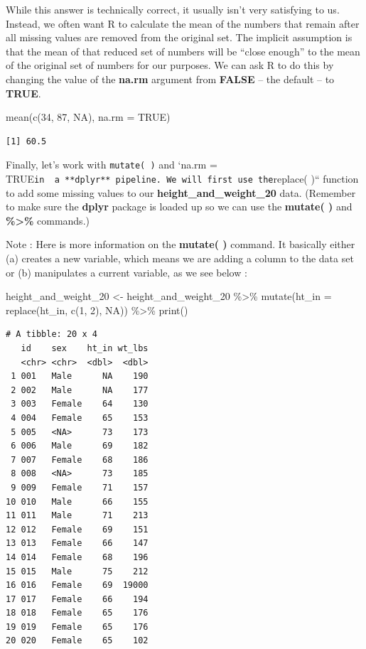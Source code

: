 \documentclass[
  letterpaper,
  DIV=11,
  numbers=noendperiod]{scrreprt}
\newenvironment{Shaded}{\begin{snugshade}}{\end{snugshade}}
\newcommand{\AttributeTok}[1]{\textcolor[rgb]{0.40,0.45,0.13}{#1}}
\newcommand{\ConstantTok}[1]{\textcolor[rgb]{0.56,0.35,0.01}{#1}}
\newcommand{\DecValTok}[1]{\textcolor[rgb]{0.68,0.00,0.00}{#1}}
\newcommand{\FunctionTok}[1]{\textcolor[rgb]{0.28,0.35,0.67}{#1}}
\newcommand{\NormalTok}[1]{\textcolor[rgb]{0.00,0.23,0.31}{#1}}
\newcommand{\OtherTok}[1]{\textcolor[rgb]{0.00,0.23,0.31}{#1}}
\newcommand{\SpecialCharTok}[1]{\textcolor[rgb]{0.37,0.37,0.37}{#1}}
\begin{document}
While this answer is technically correct, it usually isn't very
satisfying to us. Instead, we often want R to calculate the mean of the
numbers that remain after all missing values are removed from the
original set. The implicit assumption is that the mean of that reduced
set of numbers will be ``close enough'' to the mean of the original set
of numbers for our purposes. We can ask R to do this by changing the
value of the \textbf{na.rm} argument from \textbf{FALSE} -- the default
-- to \textbf{TRUE}.

\begin{Shaded}
\begin{Highlighting}[]
\FunctionTok{mean}\NormalTok{(}\FunctionTok{c}\NormalTok{(}\DecValTok{34}\NormalTok{, }\DecValTok{87}\NormalTok{, }\ConstantTok{NA}\NormalTok{), }\AttributeTok{na.rm =} \ConstantTok{TRUE}\NormalTok{)}
\end{Highlighting}
\end{Shaded}

\begin{verbatim}
[1] 60.5
\end{verbatim}

Finally, let's work with \texttt{mutate(\ )} and `na.rm =
TRUE\texttt{in\ \ a\ **dplyr**\ pipeline.\ We\ will\ first\ use\ the}replace(
)`` function to add some missing values to our
\textbf{height\_and\_weight\_20} data. (Remember to make sure the
\textbf{dplyr} package is loaded up so we can use the \textbf{mutate( )}
and \textbf{\%\textgreater\%} commands.)

Note : Here is more information on the \textbf{mutate( )} command. It
basically either (a) creates a new variable, which means we are adding a
column to the data set or (b) manipulates a current variable, as we see
below :

\begin{Shaded}
\begin{Highlighting}[]
\NormalTok{height\_and\_weight\_20 }\OtherTok{\textless{}{-}}\NormalTok{ height\_and\_weight\_20 }\SpecialCharTok{\%\textgreater{}\%} 
  \FunctionTok{mutate}\NormalTok{(}\AttributeTok{ht\_in =} \FunctionTok{replace}\NormalTok{(ht\_in, }\FunctionTok{c}\NormalTok{(}\DecValTok{1}\NormalTok{, }\DecValTok{2}\NormalTok{), }\ConstantTok{NA}\NormalTok{)) }\SpecialCharTok{\%\textgreater{}\%} 
  \FunctionTok{print}\NormalTok{()}
\end{Highlighting}
\end{Shaded}

\begin{verbatim}
# A tibble: 20 x 4
   id    sex    ht_in wt_lbs
   <chr> <chr>  <dbl>  <dbl>
 1 001   Male      NA    190
 2 002   Male      NA    177
 3 003   Female    64    130
 4 004   Female    65    153
 5 005   <NA>      73    173
 6 006   Male      69    182
 7 007   Female    68    186
 8 008   <NA>      73    185
 9 009   Female    71    157
10 010   Male      66    155
11 011   Male      71    213
12 012   Female    69    151
13 013   Female    66    147
14 014   Female    68    196
15 015   Male      75    212
16 016   Female    69  19000
17 017   Female    66    194
18 018   Female    65    176
19 019   Female    65    176
20 020   Female    65    102
\end{verbatim}
\end{document}
